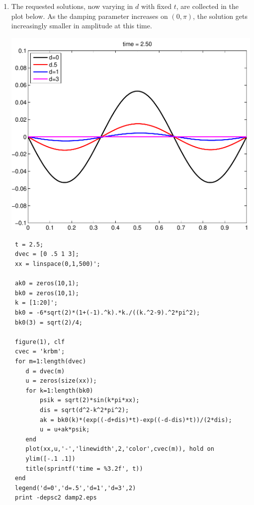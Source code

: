 \begin{solution}
\begin{enumerate}
\item The requested solutions, now varying in $d$ with fixed $t$,
      are collected in the plot below.  As the damping parameter 
      increases on $(0,\pi)$, the solution gets increasingly smaller
      in amplitude at this time.
     
      \begin{center} \includegraphics[scale=0.6]{damp2}\end{center}

{\small\begin{verbatim}
 t = 2.5;
 dvec = [0 .5 1 3];
 xx = linspace(0,1,500)';

 ak0 = zeros(10,1);
 bk0 = zeros(10,1);
 k = [1:20]';
 bk0 = -6*sqrt(2)*(1+(-1).^k).*k./((k.^2-9).^2*pi^2);
 bk0(3) = sqrt(2)/4;

 figure(1), clf
 cvec = 'krbm';
 for m=1:length(dvec)
    d = dvec(m)
    u = zeros(size(xx));
    for k=1:length(bk0)
        psik = sqrt(2)*sin(k*pi*xx);
        dis = sqrt(d^2-k^2*pi^2);
        ak = bk0(k)*(exp((-d+dis)*t)-exp((-d-dis)*t))/(2*dis);
        u = u+ak*psik;
    end 
    plot(xx,u,'-','linewidth',2,'color',cvec(m)), hold on
    ylim([-.1 .1])
    title(sprintf('time = %3.2f', t))
 end
 legend('d=0','d=.5','d=1','d=3',2)
 print -depsc2 damp2.eps
\end{verbatim}}

\end{enumerate}
\end{solution}
